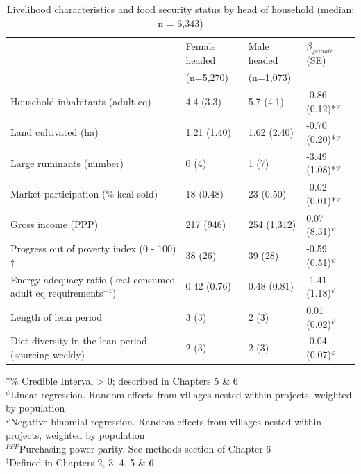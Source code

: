 \begin{table}[H]
  \captionsetup{singlelinecheck = false, justification=justified} %
   \caption{
    Livelihood characteristics and food security status by head of household (median; n = 6,343)
  }
  \label{tab:07_1}
  \small
  \centering
  \begin{tabularx}{\textwidth}{@{}lYYl@{}}  %
    \toprule
        &  Female headed & Male headed & $\beta_{female}$ (SE)  \\ %
        &(n=5,270)&(n=1,073)& \\
    \midrule

Household inhabitants (adult eq) & 4.4 (3.3) & 5.7 (4.1) & -0.86 (0.12)*$^\psi$\\
Land cultivated (ha) & 1.21 (1.40) & 1.62 (2.40) & -0.70 (0.20)*$^\psi$\\
Large ruminants (number) & 0 (4) & 1 (7) & -3.49 (1.08)*$^\psi$\\
Market participation (\% kcal sold) & 18 (0.48) & 23 (0.50) & -0.02 (0.01)*$^\psi$\\
Gross income (PPP) & 217 (946) & 254 (1,312) & 0.07 (8.31)$^\psi$\\
Progress out of poverty index (0 - 100)${\dag}$ & 38 (26) & 39 (28) & -0.59 (0.51)$^\psi$\\
Energy adequacy ratio (kcal consumed adult eq requirements$^{-1}$) & 0.42 (0.76) & 0.48 (0.81) &	-1.41 (1.18)$^\psi$\\
Length of lean period &	3 (3) &	2 (3) &	0.01 (0.02)$^\psi$\\
Diet diversity in the lean period (sourcing weekly) & 2 (3) & 2 (3) & -0.04 (0.07)$^\varphi$\\
    \bottomrule
  \end{tabularx}
  \footnotesize
  \raggedright
*\% \textbar Credible Interval > 0; described in Chapters 5 \& 6\\
$^\psi$Linear regression. Random effects from villages nested within projects, weighted by population\\
$^\varphi$Negative binomial regression. Random effects from villages nested within projects, weighted by population\\
$^{PPP}$Purchasing power parity. See methods section of Chapter 6\\
$^\dag$Defined in Chapters 2, 3, 4, 5 \& 6

\end{table}

